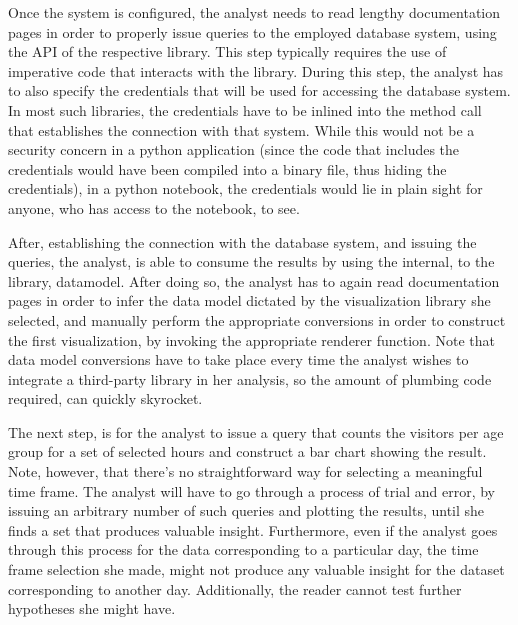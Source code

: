 Once the system is configured, the analyst needs to read lengthy documentation pages in order to properly issue queries to the employed database system, using the API of the respective library. This step typically requires the use of imperative code that interacts with the library. During this step, the analyst has to also specify the credentials that will be used for accessing the database system. In most such libraries, the credentials have to be inlined into the method call that establishes the connection with that system. While this would not be a security concern in a python application (since the code that includes the credentials would have been compiled into a binary file, thus hiding the credentials), in a python notebook, the credentials would lie in plain sight for anyone, who has access to the notebook, to see.

After, establishing the connection with the database system, and issuing the queries, the analyst, is able to consume the results by using the internal, to the library, datamodel. After doing so, the analyst has to again read documentation pages in order to infer the data model dictated by the visualization library she selected, and manually perform the appropriate conversions in order to construct the first visualization, by invoking the appropriate renderer function. Note that data model conversions have to take place every time the analyst wishes to integrate a third-party library in her analysis, so the amount of plumbing code required, can quickly skyrocket.


The next step, is for the analyst to issue a query that counts the visitors per age group for a set of selected hours and construct a bar chart showing the result. Note, however, that there's no straightforward way for selecting a meaningful time frame. The analyst will have to go through a process of trial and error, by issuing an arbitrary number of such queries and plotting the results, until she finds a set that produces valuable insight. Furthermore, even if the analyst goes through this process for the data corresponding to a particular day, the time frame selection she made, might not produce any valuable insight for the dataset corresponding to another day. Additionally, the reader cannot test further hypotheses she might have.

